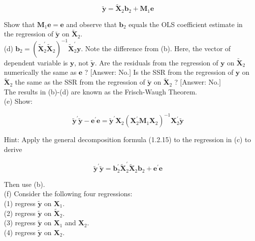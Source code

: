 \documentclass[10pt]{article}
\begin{document}
$$
\tilde{\mathbf{y}}=\widetilde{\mathbf{X}}_{2} \mathbf{b}_{2}+\mathbf{M}_{1} \mathbf{e}
$$

Show that $\mathbf{M}_{1} \mathbf{e}=\mathbf{e}$ and observe that $\mathbf{b}_{2}$ equals the OLS coefficient estimate in the regression of $\tilde{\mathbf{y}}$ on $\tilde{\mathbf{X}}_{2}$.\\
(d) $\mathbf{b}_{2}=\left(\widetilde{\mathbf{X}}_{2}^{\prime} \widetilde{\mathbf{X}}_{2}\right)^{-1} \widetilde{\mathbf{X}}_{2}^{\prime} \mathbf{y}$. Note the difference from (b). Here, the vector of dependent variable is $\mathbf{y}$, not $\tilde{\mathbf{y}}$. Are the residuals from the regression of $\mathbf{y}$ on $\widetilde{\mathbf{X}}_{2}$ numerically the same as $\mathbf{e}$ ? [Answer: No.] Is the SSR from the regression of $\mathbf{y}$ on $\widetilde{\mathbf{X}}_{2}$ the same as the SSR from the regression of $\tilde{\mathbf{y}}$ on $\widetilde{\mathbf{X}}_{2}$ ? [Answer: No.]\\
The results in (b)-(d) are known as the Frisch-Waugh Theorem.\\
(e) Show:

$$
\tilde{\mathbf{y}}^{\prime} \tilde{\mathbf{y}}-\mathbf{e}^{\prime} \mathbf{e}=\tilde{\mathbf{y}}^{\prime} \mathbf{X}_{2}\left(\mathbf{X}_{2}^{\prime} \mathbf{M}_{1} \mathbf{X}_{2}\right)^{-1} \mathbf{X}_{2}^{\prime} \tilde{\mathbf{y}}
$$

Hint: Apply the general decomposition formula (1.2.15) to the regression in (c) to derive

$$
\tilde{\mathbf{y}}^{\prime} \tilde{\mathbf{y}}=\mathbf{b}_{2}^{\prime} \tilde{\mathbf{X}}_{2}^{\prime} \tilde{\mathbf{X}}_{2} \mathbf{b}_{2}+\mathbf{e}^{\prime} \mathbf{e}
$$

Then use (b).\\
(f) Consider the following four regressions:\\
(1) regress $\tilde{\mathbf{y}}$ on $\mathbf{X}_{1}$.\\
(2) regress $\tilde{\mathbf{y}}$ on $\widetilde{\mathbf{X}}_{2}$.\\
(3) regress $\tilde{\mathbf{y}}$ on $\mathbf{X}_{1}$ and $\mathbf{X}_{2}$.\\
(4) regress $\tilde{\mathbf{y}}$ on $\mathbf{X}_{2}$.
\end{document}
